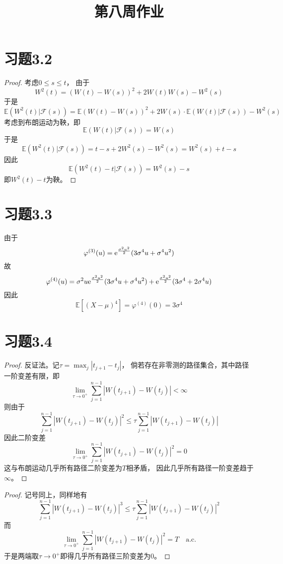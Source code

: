 \documentclass[cn]{homework}
\title{第八周作业}
\newcommand{\E}{\mathbb E}
\begin{document}
    \maketitle
    
    \section{习题3.2}
    \newcommand{\filt}{\mathcal F(s)}
    \begin{proof}
        考虑$0\leq s\leq t$，
        由于
        \[W^2(t)=(W(t)-W(s))^2+2W(t)W(s)-W^2(s)\]
        于是
        \[\E(W^2(t)|\filt)=
        \E(W(t)-W(s))^2+2W(s)\cdot\E(W(t)|\filt)-W^2(s)\]
        考虑到布朗运动为鞅，即
        \[\E(W(t)|\filt)=W(s)\]
        于是
        \[\E(W^2(t)|\filt)=t-s+2W^2(s)-W^2(s)=W^2(s)+t-s\]
        因此
        \[\E(W^2(t)-t|\filt)=W^2(s)-s\]
        即$W^2(t)-t$为鞅。
    \end{proof}

    \section{习题3.3}
    由于
    \[\varphi^{(3)}(u)=\mathrm e^{\frac{\sigma^2u^2}{2}}(3\sigma^4u+\sigma^4u^2)\]
    故
    \[\varphi^{(4)}(u)=\sigma^2u\mathrm e^{\frac{\sigma^2u^2}{2}}(3\sigma^4u+\sigma^4u^2)
    +\mathrm e^{\frac{\sigma^2u^2}{2}}(3\sigma^4+2\sigma^4u)\]
    因此
    \[\E[(X-\mu)^4]=\varphi^{(4)}(0)=3\sigma^4\]

    \section{习题3.4}
    \begin{subproblem}
        \newcommand{\gap}{|W(t_{j+1})-W(t_j)|}
        \newcommand{\sumhead}{\sum_{j=1}^{n-1}}
        \newcommand{\limhead}{\lim_{\tau\to0^+}}
        \item
        \begin{proof}
            反证法。记$\tau=\max_j|t_{j+1}-t_j|$，
            倘若存在非零测的路径集合，其中路径
            一阶变差有限，即
            \[\limhead\sumhead\gap<\infty\]
            则由于
            \[\sumhead\gap^2\leq\tau\sumhead\gap\]
            因此二阶变差
            \[\limhead\sumhead\gap^2=0\]
            这与布朗运动几乎所有路径二阶变差为$T$相矛盾，
            因此几乎所有路径一阶变差趋于$\infty$。
        \end{proof}

        \item
        \begin{proof}
            记号同上，同样地有
            \[\sumhead\gap^3\leq\tau\sumhead\gap^2\]
            而
            \[\limhead\sumhead\gap^2=T\quad\text{a.c.}\]
            于是两端取$\tau\to0^+$即得几乎所有路径三阶变差为0。
        \end{proof}
    \end{subproblem}
\end{document}
